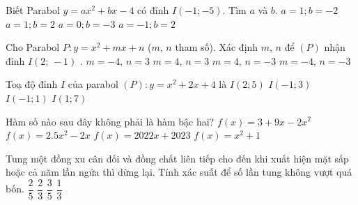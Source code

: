 \begin{ex}%
	Biết Parabol $y=ax^2+bx-4$ có  đỉnh $I(-1;-5)$. Tìm $a$ và $b$.
	 \choice
		 {$a=1;b=-2$}
		{\True$a=1;b=2$} 
		{$a=0;b=-3$} 
		 {$a=-1;b=2$}
\end{ex}

\begin{ex}%
	Cho Parabol  $P \colon y=x^2+mx+n$ ($m,\,n$ tham số). Xác định $m,\,n$ để $(P)$ nhận đỉnh $I\left(2;\,-1\right)$ .
	\choice 
		{\True  $m=-4,\,n=3$}
		 {$m=4,\,n=3$}
		 {$m=4,\,n=-3$}
		 {$m=-4,\,n=-3$}
\end{ex}

\begin{ex}%
	Toạ  độ đỉnh $I$ của parabol $(P)\colon y=x^2+2x+4$ là
	\choice 
		{$I(2;5)$} 
		{\True $I(-1;3)$} 
		{$I(-1;1)$} 
		 {$I(1;7)$}
\end{ex}

\begin{ex}%
	Hàm số nào sau  đây không phải là hàm bậc hai?
	 \choice
		 {$f(x)=3+9x-2x^2$}
		 {$f(x)=2.5x^2-2x$}
		 {\True $f(x)=2022x+2023$}
		{$f(x)=x^2+1$} 
\end{ex}

\begin{ex}%
	Tung một đồng xu cân đối và đồng chất liên tiếp cho đến khi xuất hiện mặt sấp hoặc cả  năm lần ngửa thì dừng lại. Tính xác suất để số lần tung không vượt quá bốn.
	 \choice
		 {$\dfrac{2}{5}$}
		 {\True $\dfrac{2}{3}$}
		 {$\dfrac{3}{5}$}
		 {$\dfrac{1}{3}$}
\end{ex}

